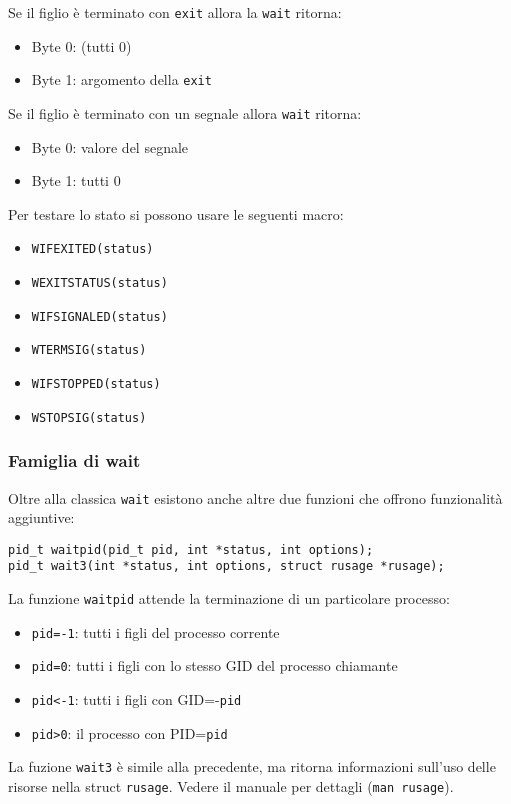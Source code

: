 \documentclass[a4paper, 10pt]{article}
\begin{document}
Se il figlio è terminato con \verb|exit| allora la \verb|wait| ritorna: 
\begin{itemize}
\item Byte 0: (tutti 0)
\item Byte 1: argomento della \verb|exit|
\end{itemize}
Se il figlio è terminato con un segnale allora \verb|wait| ritorna:
\begin{itemize}
\item Byte 0: valore del segnale
\item Byte 1: tutti 0
\end{itemize}

Per testare lo stato si possono usare le seguenti macro:
\begin{itemize}
\item \verb|WIFEXITED(status)|
\item \verb|WEXITSTATUS(status)|
\item \verb|WIFSIGNALED(status)|
\item \verb|WTERMSIG(status)|
\item \verb|WIFSTOPPED(status)|
\item \verb|WSTOPSIG(status)|
\end{itemize}

\subsubsection{Famiglia di wait}
Oltre alla classica \verb|wait| esistono anche altre due funzioni che offrono funzionalità aggiuntive:
\begin{verbatim}
pid_t waitpid(pid_t pid, int *status, int options);
pid_t wait3(int *status, int options, struct rusage *rusage);
\end{verbatim}

La funzione \verb|waitpid| attende la terminazione di un particolare processo:
\begin{itemize}
\item \verb|pid=-1|: tutti i figli del processo corrente
\item \verb|pid=0|: tutti i figli con lo stesso GID del processo chiamante
\item \verb|pid<-1|: tutti i figli con GID=-\verb|pid|
\item \verb|pid>0|: il processo con PID=\verb|pid|
\end{itemize}
La fuzione \verb|wait3| è simile alla precedente, ma ritorna informazioni sull'uso delle risorse nella struct \verb|rusage|. Vedere il manuale per dettagli (\verb|man rusage|).
\end{document}
